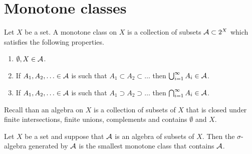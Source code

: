 \documentclass[twoside, a4paper, 10pt]{amsart}
\begin{document}
\section{Monotone classes}

\begin{mydef} Let $X$ be a set. A monotone class on $X$ is a collection of subsets $\mathcal{A} \subset 2^X$ which satisfies the following properties.

\begin{enumerate}
	\item $\emptyset, X \in \mathcal{A}$.
	\item If $A_1,A_2,\ldots \in \mathcal{A}$ is such that $A_1 \subset A_2 \subset \ldots$ then $\bigcup_{i=1}^{\infty} A_i \in \mathcal{A}$.
	\item If $A_1,A_2,\ldots \in \mathcal{A}$ is such that $A_1 \supset A_2 \supset \ldots$ then $\bigcap_{i=1}^{\infty} A_i \in \mathcal{A}$.
\end{enumerate}

\end{mydef}
 
Recall than an algebra on $X$ is a collection of subsets of $X$ that is closed under finite intersections, finite unions, complements and contains $\emptyset$ and $X$.

\begin{thm} Let $X$ be a set and suppose that $\mathcal{A}$ is an algebra of subsets of $X$. Then the $\sigma$-algebra generated by $\mathcal{A}$ is the smallest monotone class that contains $\mathcal{A}$.

\end{thm}
\end{document}
